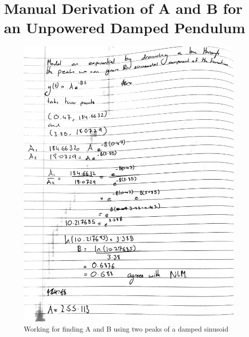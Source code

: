\documentclass[a4paper, 11pt, compsoc]{IEEEtran}
\begin{document}
        \section{Manual Derivation of A and B for an Unpowered Damped Pendulum}\label{app:AB}
            \begin{figure}[!h]
                \centering
                \includegraphics[width=0.9\columnwidth]{AB.jpg}
                \caption{Working for finding A and B using two peaks of a damped sinusoid}
                \label{fig:workingAB}
            \end{figure}
\end{document}
